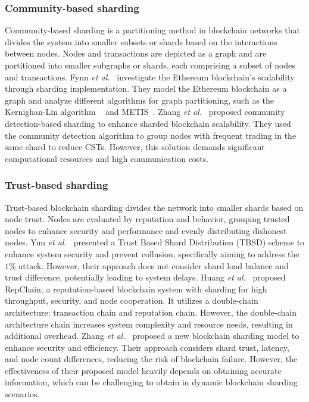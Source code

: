 \subsubsection{Community-based sharding}
Community-based sharding is a partitioning method in blockchain networks that divides the system into smaller subsets or shards based on the interactions between nodes. Nodes and transactions are depicted as a graph and are partitioned into smaller subgraphs or shards, each comprising a subset of nodes and transactions. Fynn \textit{et al.}~\cite{fynn2018challenges} investigate the Ethereum blockchain's scalability through sharding implementation. They model the Ethereum blockchain as a graph and analyze different algorithms for graph partitioning, such as the Kernighan-Lin algorithm ~\cite{kernighan1970efficient} and METIS~\cite{karypis1998fast}. Zhang \textit{et al.}~\cite{zhang2022community} proposed community detection-based sharding to enhance sharded blockchain scalability. They used the community detection algorithm to group nodes with frequent trading in the same shard to reduce CSTs. However, this solution demands significant computational resources and high communication costs.


\subsubsection{Trust-based sharding}
Trust-based blockchain sharding divides the network into smaller shards based on node trust. Nodes are evaluated by reputation and behavior, grouping trusted nodes to enhance security and performance and evenly distributing dishonest nodes. Yun \textit{et al.}~\cite{yun2019trust} presented a Trust Based Shard Distribution (TBSD) scheme to enhance system security and prevent collusion, specifically aiming to address the $1\%$ attack. However, their approach does not consider shard load balance and trust difference, potentially leading to system delays. Huang \textit{et al.}~\cite{huang2020repchain} proposed RepChain, a reputation-based blockchain system with sharding for high throughput, security, and node cooperation. It utilizes a double-chain architecture: transaction chain and reputation chain. However, the double-chain architecture chain increases system complexity and resource needs, resulting in additional overhead. Zhang \textit{et al.}~\cite{zhang2023optimized} proposed a new blockchain sharding model to enhance security and efficiency. Their approach considers shard trust, latency, and node count differences, reducing the risk of blockchain failure. However, the effectiveness of their proposed model heavily depends on obtaining accurate information, which can be challenging to obtain in dynamic blockchain sharding scenarios.
 

